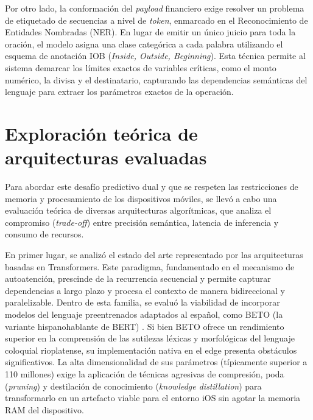 Por otro lado, la conformación del \textit{payload} financiero exige resolver un problema de etiquetado de secuencias a nivel de \textit{token}, enmarcado en el Reconocimiento de Entidades Nombradas (NER)\citep{lample2016neural}. En lugar de emitir un único juicio para toda la oración, el modelo asigna una clase categórica a cada palabra utilizando el esquema de anotación IOB (\textit{Inside, Outside, Beginning}). Esta técnica permite al sistema demarcar los límites exactos de variables críticas, como el monto numérico, la divisa y el destinatario, capturando las dependencias semánticas del lenguaje para extraer los parámetros exactos de la operación.



\section{Exploración teórica de arquitecturas evaluadas}

Para abordar este desafío predictivo dual y que se respeten las restricciones de memoria y procesamiento de los dispositivos móviles, se llevó a cabo una evaluación teórica de diversas arquitecturas algorítmicas, que analiza el compromiso (\textit{trade-off}) entre precisión semántica, latencia de inferencia y consumo de recursos.

En primer lugar, se analizó el estado del arte representado por las arquitecturas basadas en Transformers. Este paradigma, fundamentado en el mecanismo de autoatención, prescinde de la recurrencia secuencial y permite capturar dependencias a largo plazo y procesa el contexto de manera bidireccional y paralelizable. Dentro de esta familia, se evaluó la viabilidad de incorporar modelos del lenguaje preentrenados adaptados al español, como BETO (la variante hispanohablante de BERT) \citep{canete2020spanish}. Si bien BETO ofrece un rendimiento superior en la comprensión de las sutilezas léxicas y morfológicas del lenguaje coloquial rioplatense, su implementación nativa en el edge presenta obstáculos significativos. La alta dimensionalidad de sus parámetros (típicamente superior a 110 millones) exige la aplicación de técnicas agresivas de compresión, poda (\textit{pruning}) y destilación de conocimiento (\textit{knowledge distillation}) para transformarlo en un artefacto viable para el entorno iOS sin agotar la memoria RAM del dispositivo.

